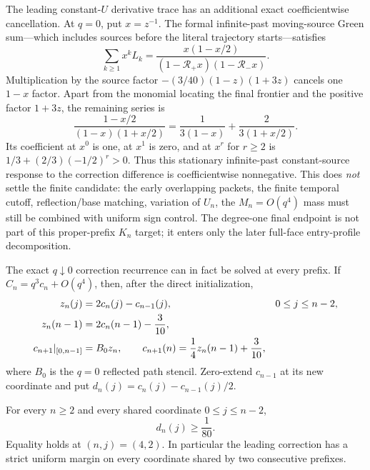 The leading constant-$U$ derivative trace has an additional exact
coefficientwise cancellation.  At $q=0$, put $x=z^{-1}$.  The formal
infinite-past moving-source Green sum---which includes sources before the
literal trajectory starts---satisfies
\begin{equation}
 \sum_{k\ge1}x^kL_k
 =\frac{x(1-x/2)}{(1-\mathcal R_+x)(1-\mathcal R_-x)}.
 \label{eq:terminal-modal-correction-green-generating}
\end{equation}
Multiplication by the source factor $-(3/40)(1-z)(1+3z)$ cancels one
$1-x$ factor.  Apart from the monomial locating the final frontier and the
positive factor $1+3z$, the remaining series is
\begin{equation}
 \frac{1-x/2}{(1-x)(1+x/2)}
 =\frac1{3(1-x)}+\frac2{3(1+x/2)}.
 \label{eq:terminal-modal-correction-positive-series}
\end{equation}
Its coefficient at $x^0$ is one, at $x^1$ is zero, and at $x^r$ for
$r\ge2$ is
$1/3+(2/3)(-1/2)^r>0$.  Thus this stationary infinite-past constant-source
response to the correction difference is coefficientwise nonnegative.  This does
\emph{not} settle the finite candidate: the early overlapping packets, the
finite temporal cutoff, reflection/base matching, variation of $U_n$, the
$M_n=O(q^4)$ mass must still be combined with uniform sign control.  The
degree-one final endpoint is not part of this proper-prefix $K_n$ target; it
enters only the later full-face entry-profile decomposition.

The exact $q\downarrow0$ correction recurrence can in fact be solved at every
prefix.  If $C_n=q^3c_n+O(q^4)$, then, after the direct initialization,
\begin{align}
 z_n(j)&=2c_n(j)-c_{n-1}(j),&&0\le j\le n-2,\notag\\
 z_n(n-1)&=2c_n(n-1)-\frac3{10},
 \label{eq:terminal-modal-leading-correction-recurrence}\\
 c_{n+1}|_{[0,n-1]}&=B_0z_n,\qquad
 c_{n+1}(n)=\frac14z_n(n-1)+\frac3{10},\notag
\end{align}
where $B_0$ is the $q=0$ reflected path stencil.  Zero-extend $c_{n-1}$ at its
new coordinate and put
$d_n(j)=c_n(j)-c_{n-1}(j)/2$.

\begin{lemma}
\label{lem:terminal-modal-leading-correction-sign}
For every $n\ge2$ and every shared coordinate $0\le j\le n-2$,
\begin{equation}
 d_n(j)\ge\frac1{80}.
 \label{eq:terminal-modal-leading-correction-sign}
\end{equation}
Equality holds at $(n,j)=(4,2)$.  In particular the leading correction has a
strict uniform margin on every coordinate shared by two consecutive
prefixes.
\end{lemma}


